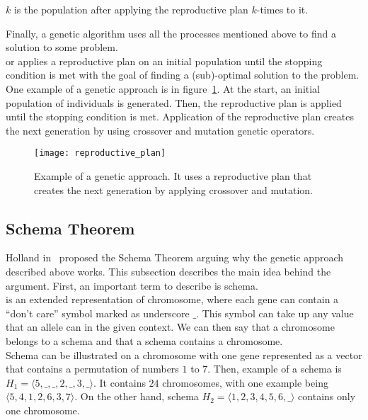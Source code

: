  $k$ is the population after applying the reproductive plan $k$-times to it.\\

\newpage

Finally, a genetic algorithm uses all the processes mentioned above to
find a solution to some problem.\\

 or  applies a reproductive plan
on an initial population until the stopping condition is met with the
goal of finding a (sub)-optimal solution to the problem.\\

One example of a genetic approach is in figure~\ref{fig:reproductive-plan}.
At the start, an initial population of individuals is generated.
Then, the reproductive plan is applied until the stopping condition is met.
Application of the reproductive plan creates the next generation by using crossover and mutation genetic operators.

\begin{figure}[h]
    \texttt{[image: reproductive\_plan]}
    \caption[Example of a genetic approach]{
        Example of a genetic approach.
        It uses a reproductive plan that creates the next generation by applying crossover and mutation.}
    \label{fig:reproductive-plan}
\end{figure}

\subsection{Schema Theorem}\label{subsec:schema-theorem}

Holland in~\cite{hollandAdaptationNaturalArtificial1975} proposed
the Schema Theorem arguing why the genetic approach described above works.
This subsection describes the main idea behind the argument.
First, an important term to describe is schema.\\

 is an extended representation of chromosome,
where each gene can contain a “don’t care” symbol marked as underscore $\_$.
This symbol can take up any value that an allele can in the given context.
We can then say that a chromosome belongs to a schema
and that a schema contains a chromosome.\\

Schema can be illustrated on a chromosome with one gene represented as a vector that contains a permutation of numbers $1$ to $7$.
Then, example of a schema is $H_1 = \langle 5, \_, \_, 2, \_, 3, \_ \rangle$.
It contains $24$ chromosomes, with one example being $\langle 5, 4, 1, 2, 6, 3, 7 \rangle$.
On the other hand, schema $H_2 = \langle 1, 2, 3, 4, 5, 6, \_ \rangle$ contains only one chromosome.

